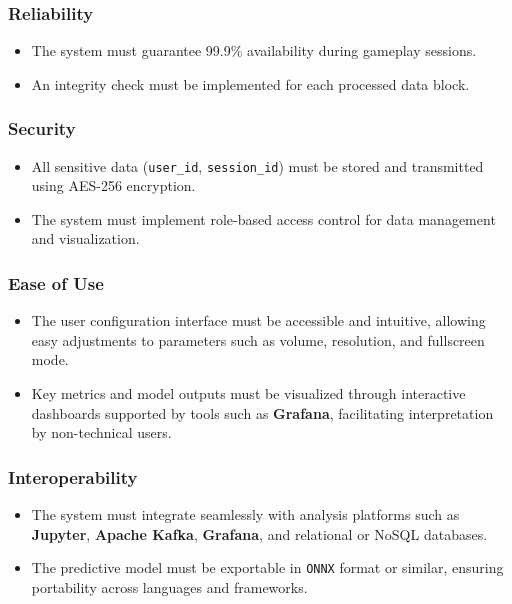 \documentclass{article}
\newcommand{\reqnumNF}[1]{\textbf{\underline{RNF-#1}}}
\begin{document}
\subsubsection{Reliability}
\begin{itemize}
    \item[\reqnumNF{003}] The system must guarantee 99.9\% availability during gameplay sessions.
    \item[\reqnumNF{004}] An integrity check must be implemented for each processed data block.
\end{itemize}

\subsubsection{Security}
\begin{itemize}
    \item[\reqnumNF{005}] All sensitive data (\texttt{user\_id}, \texttt{session\_id}) must be stored and transmitted using AES-256 encryption.
    \item[\reqnumNF{006}] The system must implement role-based access control for data management and visualization.
\end{itemize}

\subsubsection{Ease of Use}
\begin{itemize}
    \item[\reqnumNF{007}] The user configuration interface must be accessible and intuitive, allowing easy adjustments to parameters such as volume, resolution, and fullscreen mode.
    \item[\reqnumNF{008}] Key metrics and model outputs must be visualized through interactive dashboards supported by tools such as \textbf{Grafana}, facilitating interpretation by non-technical users.
\end{itemize}

\subsubsection{Interoperability}
\begin{itemize}
    \item[\reqnumNF{009}] The system must integrate seamlessly with analysis platforms such as \textbf{Jupyter}, \textbf{Apache Kafka}, \textbf{Grafana}, and relational or NoSQL databases.
    \item[\reqnumNF{010}] The predictive model must be exportable in \texttt{ONNX} format or similar, ensuring portability across languages and frameworks.
\end{itemize}
    
\end{document}
